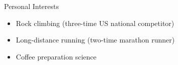 \documentclass{resume} %
\begin{document}

\begin{rSection}{Personal Interests}

\begin{itemize}
			\renewcommand\labelitemi{$\cdot$} 
	\item Rock climbing (three-time US national competitor)
	\item Long-distance running (two-time marathon runner)
	\item Coffee preparation science
\end{itemize}

\end{rSection}






\end{document}
